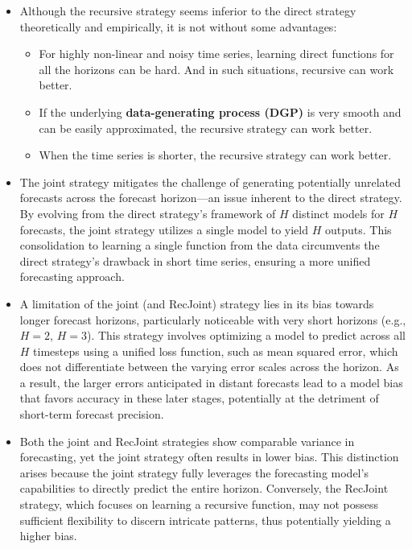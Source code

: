 \documentclass{article}
\begin{document}
\begin{itemize}
    \item Although the recursive strategy seems inferior to the direct strategy theoretically and empirically, it is not without some advantages:
    \begin{itemize}
        \item For highly non-linear and noisy time series, learning direct functions for all the horizons can be hard. And in such situations, recursive can work better.
        \item If the underlying \textbf{data-generating process (DGP)} is very smooth and can be easily approximated, the recursive strategy can work better.
        \item When the time series is shorter, the recursive strategy can work better.
    \end{itemize}
    \item The joint strategy mitigates the challenge of generating potentially unrelated forecasts across the forecast horizon—an issue inherent to the direct strategy. By evolving from the direct strategy's framework of \(H\) distinct models for \(H\) forecasts, the joint strategy utilizes a single model to yield \(H\) outputs. This consolidation to learning a single function from the data circumvents the direct strategy's drawback in short time series, ensuring a more unified forecasting approach.
    \item A limitation of the joint (and RecJoint) strategy lies in its bias towards longer forecast horizons, particularly noticeable with very short horizons (e.g., \(H = 2\), \(H = 3\)). This strategy involves optimizing a model to predict across all \(H\) timesteps using a unified loss function, such as mean squared error, which does not differentiate between the varying error scales across the horizon. As a result, the larger errors anticipated in distant forecasts lead to a model bias that favors accuracy in these later stages, potentially at the detriment of short-term forecast precision.
    \item Both the joint and RecJoint strategies show comparable variance in forecasting, yet the joint strategy often results in lower bias. This distinction arises because the joint strategy fully leverages the forecasting model's capabilities to directly predict the entire horizon. Conversely, the RecJoint strategy, which focuses on learning a recursive function, may not possess sufficient flexibility to discern intricate patterns, thus potentially yielding a higher bias.
\end{itemize}
\end{document}
